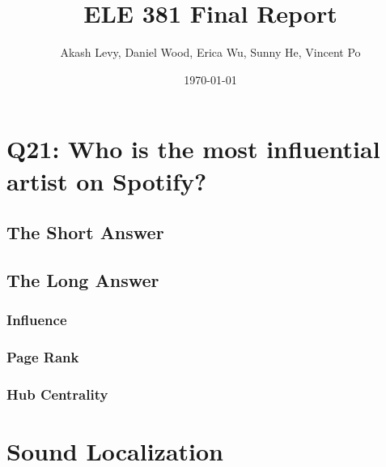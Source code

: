 \documentclass[12pt, oneside]{article}
\title{ELE 381 Final Report}
\author{Akash Levy, Daniel Wood, Erica Wu, Sunny He, Vincent Po}
\date{\today}
\begin{document}
\maketitle

\section{Q21: Who is the most influential artist on Spotify?}

\subsection{The Short Answer}

\subsection{The Long Answer}
\subsubsection{Influence}

\subsubsection{Page Rank}

\subsubsection{Hub Centrality}
\section{Sound Localization}



%
\end{document}
